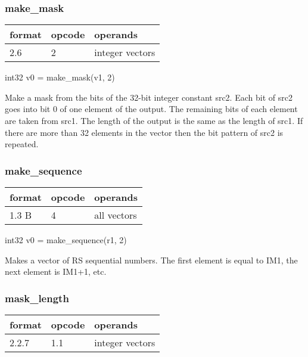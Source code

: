 \documentclass[forwardcom.tex]{subfiles}
\begin{document}
\subsubsection{make\_mask}
\label{table:makeMaskInstruction}
\begin{tabular}{|p{12mm}|p{12mm}|p{110mm}|}
\hline
\bfseries format & \bfseries opcode & \bfseries operands \\ \hline
2.6 &  2 & integer vectors \\ \hline
\end{tabular}
\vspace{2mm}

int32 v0 = make\_mask(v1, 2)
\vspace{2mm}

Make a mask from the bits of the 32-bit integer constant src2. Each bit of src2 goes into bit 0 of one element of the output. The remaining bits of each element are taken from src1. The length of the output is the same as the length of src1. If there are more than 32 elements in the vector then the bit pattern of src2 is repeated.

\subsubsection{make\_sequence}
\label{table:makeSequenceInstruction}
\begin{tabular}{|p{12mm}|p{12mm}|p{110mm}|}
\hline
\bfseries format & \bfseries opcode & \bfseries operands \\ \hline
1.3 B &  4 & all vectors \\ \hline
\end{tabular}
\vspace{2mm}

int32 v0 = make\_sequence(r1, 2)
\vspace{2mm}

Makes a vector of RS sequential numbers. 
The first element is equal to IM1, the next element is IM1+1, etc.

\subsubsection{mask\_length}
\label{table:maskLengthInstruction}
\begin{tabular}{|p{12mm}|p{12mm}|p{110mm}|}
\hline
\bfseries format & \bfseries opcode & \bfseries operands \\ \hline
2.2.7 & 1.1 & integer vectors \\ \hline
\end{tabular}
\vspace{2mm}
\end{document}
